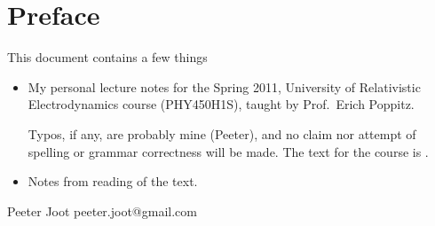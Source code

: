 \chapter*{Preface}\normalsize

This document contains a few things

\begin{itemize}
\item My personal lecture notes for the Spring 2011, University of Relativistic Electrodynamics course (PHY450H1S), taught by Prof.\ Erich Poppitz.

Typos, if any, are probably mine (Peeter), and no claim nor attempt of spelling or grammar correctness will be made.  The text for the course is \cite{landau1980classical}.

\item Notes from reading of the text.
%
%
\end{itemize}

Peeter Joot  \quad peeter.joot@gmail.com 
